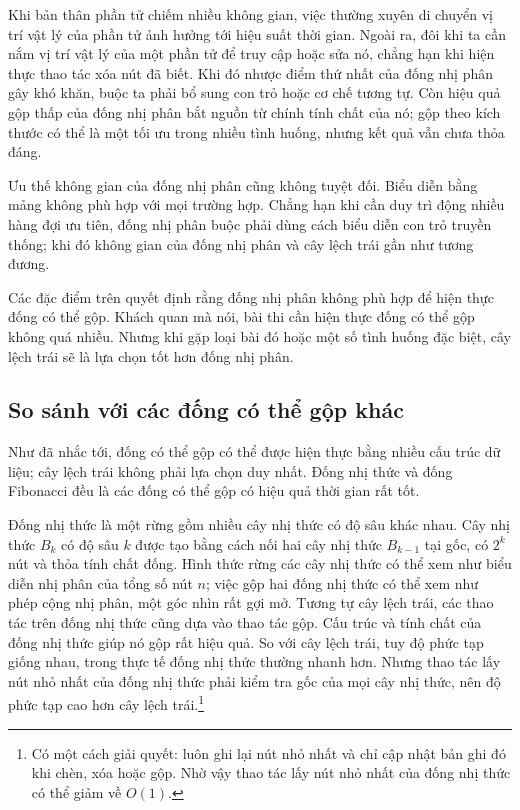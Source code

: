 \documentclass[11pt]{article}
\begin{document}
Khi bản thân phần tử chiếm nhiều không gian, việc thường xuyên di chuyển vị trí
vật lý của phần tử ảnh hưởng tới hiệu suất thời gian. Ngoài ra, đôi khi ta cần
nắm vị trí vật lý của một phần tử để truy cập hoặc sửa nó, chẳng hạn khi hiện
thực thao tác xóa nút đã biết. Khi đó nhược điểm thứ nhất của đống nhị phân gây
khó khăn, buộc ta phải bổ sung con trỏ hoặc cơ chế tương tự. Còn hiệu quả gộp
thấp của đống nhị phân bắt nguồn từ chính tính chất của nó; gộp theo kích thước
có thể là một tối ưu trong nhiều tình huống, nhưng kết quả vẫn chưa thỏa đáng.

Ưu thế không gian của đống nhị phân cũng không tuyệt đối. Biểu diễn bằng mảng
không phù hợp với mọi trường hợp. Chẳng hạn khi cần duy trì động nhiều hàng đợi
ưu tiên, đống nhị phân buộc phải dùng cách biểu diễn con trỏ truyền thống; khi
đó không gian của đống nhị phân và cây lệch trái gần như tương đương.

Các đặc điểm trên quyết định rằng đống nhị phân không phù hợp để hiện thực đống
có thể gộp. Khách quan mà nói, bài thi cần hiện thực đống có thể gộp không quá
nhiều. Nhưng khi gặp loại bài đó hoặc một số tình huống đặc biệt, cây lệch trái
sẽ là lựa chọn tốt hơn đống nhị phân.

\subsection{So sánh với các đống có thể gộp khác}

Như đã nhắc tới, đống có thể gộp có thể được hiện thực bằng nhiều cấu trúc dữ
liệu; cây lệch trái không phải lựa chọn duy nhất. Đống nhị thức và đống
Fibonacci đều là các đống có thể gộp có hiệu quả thời gian rất tốt.

Đống nhị thức là một rừng gồm nhiều cây nhị thức có độ sâu khác nhau. Cây nhị
thức \(B_k\) có độ sâu \(k\) được tạo bằng cách nối hai cây nhị thức
\(B_{k-1}\) tại gốc, có \(2^k\) nút và thỏa tính chất đống. Hình thức rừng các
cây nhị thức có thể xem như biểu diễn nhị phân của tổng số nút \(n\); việc gộp
hai đống nhị thức có thể xem như phép cộng nhị phân, một góc nhìn rất gợi mở.
Tương tự cây lệch trái, các thao tác trên đống nhị thức cũng dựa vào thao tác
gộp. Cấu trúc và tính chất của đống nhị thức giúp nó gộp rất hiệu quả. So với
cây lệch trái, tuy độ phức tạp giống nhau, trong thực tế đống nhị thức thường
nhanh hơn. Nhưng thao tác lấy nút nhỏ nhất của đống nhị thức phải kiểm tra gốc
của mọi cây nhị thức, nên độ phức tạp cao hơn cây lệch trái.\footnote{Có một
cách giải quyết: luôn ghi lại nút nhỏ nhất và chỉ cập nhật bản ghi đó khi chèn,
xóa hoặc gộp. Nhờ vậy thao tác lấy nút nhỏ nhất của đống nhị thức có thể giảm
về \(O(1)\).}
\end{document}

